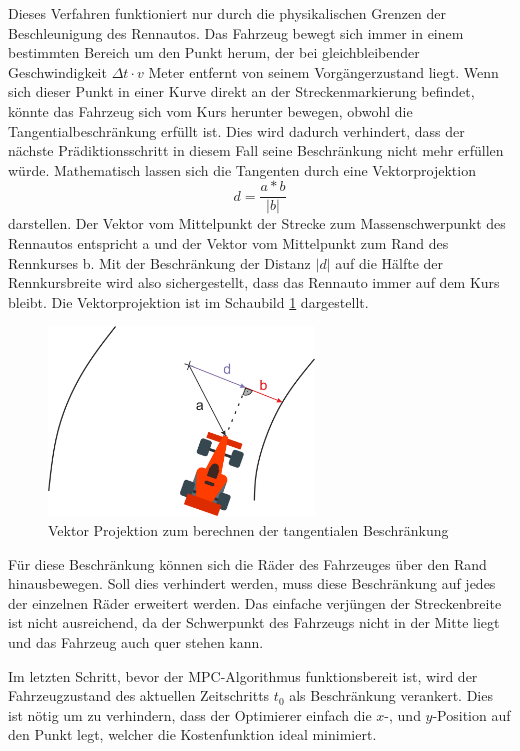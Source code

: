 \documentclass{like}
\begin{document}
Dieses Verfahren funktioniert nur durch die physikalischen Grenzen der Beschleunigung des Rennautos. Das Fahrzeug bewegt sich immer in einem bestimmten Bereich um den Punkt herum, der bei gleichbleibender Geschwindigkeit $\Delta t \cdot v$ Meter entfernt von seinem Vorgängerzustand liegt. Wenn sich dieser Punkt in einer Kurve direkt an der Streckenmarkierung befindet, könnte das Fahrzeug sich vom Kurs herunter bewegen, obwohl die Tangentialbeschränkung erfüllt ist. Dies wird dadurch verhindert, dass der nächste Prädiktionsschritt in diesem Fall seine Beschränkung nicht mehr erfüllen würde.
Mathematisch lassen sich die Tangenten durch eine Vektorprojektion 
\begin{equation}
	d = \frac{a*b}{|b|}
\end{equation}
darstellen. Der Vektor vom Mittelpunkt der Strecke zum Massenschwerpunkt des Rennautos entspricht a und der Vektor vom Mittelpunkt zum Rand des Rennkurses b. Mit der Beschränkung der Distanz $|d|$ auf die Hälfte der Rennkursbreite wird also sichergestellt, dass das Rennauto immer auf dem Kurs bleibt.
Die Vektorprojektion ist im Schaubild \ref{fig:vektorProjektion} dargestellt.

\begin{figure}[ht!]
	\centering
	\includegraphics[width=200pt]{Abbildungen/vektorProjection.png}
	\caption{Vektor Projektion zum berechnen der tangentialen Beschränkung}
	\label{fig:vektorProjektion}
\end{figure}

Für diese Beschränkung können sich die Räder des Fahrzeuges über den Rand hinaus\-be\-we\-gen. Soll dies verhindert werden, muss diese Beschränkung auf jedes der einzelnen Räder erweitert werden. Das einfache verjüngen der Streckenbreite ist nicht ausreichend, da der Schwerpunkt des Fahrzeugs nicht in der Mitte liegt und das Fahrzeug auch quer stehen kann.

Im letzten Schritt, bevor der \ac{MPC}-Algorithmus funktionsbereit ist, wird der Fahrzeug\-zu\-stand des aktuellen Zeitschritts $t_0$ als Beschränkung verankert.  Dies ist nötig um zu verhindern, dass der Optimierer einfach die \(x\)-, und \(y\)-Position auf den Punkt legt, welcher die Kostenfunktion ideal minimiert. 
\end{document}

